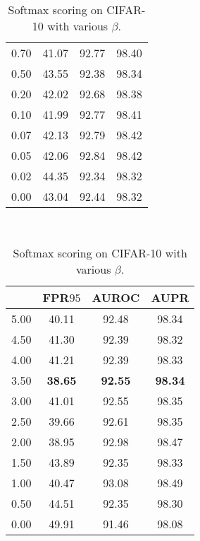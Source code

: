\documentclass{article}
\begin{document}
\begin{table}[t]
{{\begin{tabular}{c|ccc}
0.70               & 41.07                  & 92.77                  & 98.40       \\
0.50               & 43.55                  & 92.38                  & 98.34       \\ 
0.20               & 42.02                  & 92.68                  & 98.38       \\
0.10               & 41.99                  & 92.77                  & 98.41       \\
0.07               & 42.13                  & 92.79                  & 98.42       \\
0.05               & 42.06                  & 92.84                  & 98.42       \\ 
0.02               & 44.35                  & 92.34                  & 98.32       \\
0.00               & 43.04                  & 92.44                  & 98.32       \\
\bottomrule[1.5pt]      
\end{tabular}
}
}~~
\parbox{.30\linewidth}{
\centering
\caption{Softmax scoring on CIFAR-10 with various $\beta$.} \label{tab: ablation beta full cifar10}
\scriptsize
\vspace{5pt}
{
\begin{tabular}{c|ccc}
\toprule[1.5pt]
             & FPR$95$     & AUROC       & AUPR     \\
\midrule[0.6pt]
5.00               & 40.11                  & 92.48                  & 98.34 \\
4.50               & 41.30                  & 92.39                  & 98.32 \\
4.00               & 41.21                  & 92.39                  & 98.33 \\
\cellcolor{greyC}3.50               & \cellcolor{greyC}\textbf{38.65}                  & \cellcolor{greyC}\textbf{92.55}                  & \cellcolor{greyC}\textbf{98.34}      \\
3.00               & 41.01                  & 92.55                  & 98.35 \\
2.50               & 39.66                  & 92.61                  & 98.35 \\
2.00               & 38.95                  & 92.98                  & 98.47 \\
1.50               & 43.89                  & 92.35                  & 98.33 \\
1.00               & 40.47                  & 93.08                  & 98.49 \\
0.50               & 44.51                  & 92.35                  & 98.30 \\
0.00               & 49.91                  & 91.46                  & 98.08 \\
\bottomrule[1.5pt]      
\end{tabular}
}
}
\end{table}
\end{document}
